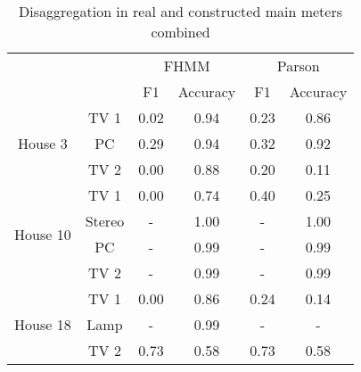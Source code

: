 \begin{table}[H]                             
\centering                                   
\begin{tabular}{cc|c|c|c|c|}
\cline{3-6}
\multicolumn{1}{l}{}                            &        & \multicolumn{2}{c|}{FHMM} & \multicolumn{2}{c|}{Parson} \\ \cline{3-6} 
\multicolumn{1}{l}{}                            &        & F1        & Accuracy      & F1         & Accuracy       \\ \hline
\multicolumn{1}{|c|}{\multirow{3}{*}{House 3}}  & TV 1   & 0.02      & 0.94          & 0.23       & 0.86           \\ \cline{2-6} 
\multicolumn{1}{|c|}{}                          & PC     & 0.29      & 0.94          & 0.32       & 0.92           \\ \cline{2-6} 
\multicolumn{1}{|c|}{}                          & TV 2   & 0.00      & 0.88          & 0.20       & 0.11           \\ \hline
\multicolumn{1}{|c|}{\multirow{4}{*}{House 10}} & TV 1   & 0.00      & 0.74          & 0.40       & 0.25           \\ \cline{2-6} 
\multicolumn{1}{|c|}{}                          & Stereo & -         & 1.00          & -          & 1.00           \\ \cline{2-6} 
\multicolumn{1}{|c|}{}                          & PC     & -         & 0.99          & -          & 0.99           \\ \cline{2-6} 
\multicolumn{1}{|c|}{}                          & TV 2   & -         & 0.99          & -          & 0.99           \\ \hline
\multicolumn{1}{|c|}{\multirow{3}{*}{House 18}} & TV 1   & 0.00      & 0.86          & 0.24       & 0.14           \\ \cline{2-6} 
\multicolumn{1}{|c|}{}                          & Lamp   & -         & 0.99          & -          & -              \\ \cline{2-6} 
\multicolumn{1}{|c|}{}                          & TV 2   & 0.73      & 0.58          & 0.73       & 0.58           \\ \hline
\end{tabular}                                
\caption{Disaggregation in real and constructed main meters combined}                     
\label{table:Tab:SHGREALSIM}                 
\end{table}    